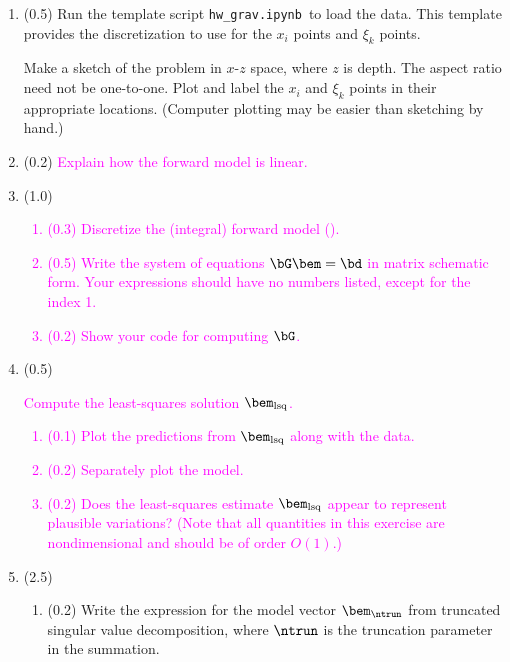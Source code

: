 \documentclass[11pt,titlepage,fleqn]{article}
\newcommand{\tfile}{{\tt hw\_grav.ipynb}}
\newcommand{\mv}{\xi}  %
\newcommand{\dv}{x}  %
\newcommand{\tcolor}{magenta}
\begin{document}


\begin{enumerate}
\item (0.5) Run the template script \tfile\ to load the data. This template provides the discretization to use for the $\dv_i$ points and $\mv_k$ points.

Make a sketch of the problem in $x$-$z$ space, where $z$ is depth. The aspect ratio need not be one-to-one. Plot and label the $\dv_i$ and $\mv_k$ points in their appropriate locations. (Computer plotting may be easier than sketching by hand.)


\item (0.2) \textcolor{\tcolor}{Explain how the forward model is linear.}
\label{prob1}


\item (1.0)
\textcolor{\tcolor}{
\begin{enumerate}
\item (0.3) Discretize the (integral) forward model ().
\item (0.5) Write the system of equations $\bG\bem = \bd$ in matrix schematic form. Your expressions should have no numbers listed, except for the index 1.
\item (0.2) Show your code for computing $\bG$.
\end{enumerate}
}


\item (0.5) 
\textcolor{\tcolor}{
Compute the least-squares solution $\bem_{\rm lsq}$.
\begin{enumerate}
\item (0.1) Plot the predictions from $\bem_{\rm lsq}$ along with the data.
\item (0.2) Separately plot the model.
\item (0.2) Does the least-squares estimate $\bem_{\rm lsq}$ appear to represent plausible variations? (Note that all quantities in this exercise are nondimensional and should be of order $O(1)$.)
\end{enumerate}
}


\item (2.5)

\begin{enumerate}
\item (0.2) Write the expression for the model vector $\bem_{\ntrun}$ from truncated singular value decomposition, where $\ntrun$ is the truncation parameter in the summation.


\end{enumerate}
\end{enumerate}
\end{document}
